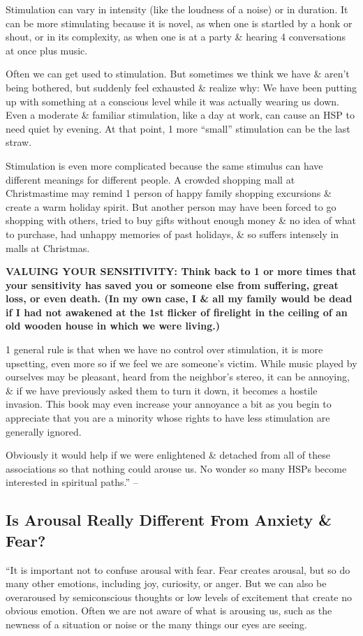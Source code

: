 \documentclass{article}
\numberwithin{equation}{section}
\begin{document}
Stimulation can vary in intensity (like the loudness of a noise) or in duration. It can be more stimulating because it is novel, as when one is startled by a honk or shout, or in its complexity, as when one is at a party \& hearing 4 conversations at once plus music.

Often we can get used to stimulation. But sometimes we think we have \& aren't being bothered, but suddenly feel exhausted \& realize why: We have been putting up with something at a conscious level while it was actually wearing us down. Even a moderate \& familiar stimulation, like a day at work, can cause an HSP to need quiet by evening. At that point, 1 more ``small'' stimulation can be the last straw.

Stimulation is even more complicated because the same stimulus can have different meanings for different people. A crowded shopping mall at Christmastime may remind 1 person of happy family shopping excursions \& create a warm holiday spirit. But another person may have been forced to go shopping with others, tried to buy gifts without enough money \& no idea of what to purchase, had unhappy memories of past holidays, \& so suffers intensely in malls at Christmas.

\textbf{VALUING YOUR SENSITIVITY: Think back to 1 or more times that your sensitivity has saved you or someone else from suffering, great loss, or even death. (In my own case, I \& all my family would be dead if I had not awakened at the 1st flicker of firelight in the ceiling of an old wooden house in which we were living.)}

1 general rule is that when we have no control over stimulation, it is more upsetting, even more so if we feel we are someone's victim. While music played by ourselves may be pleasant, heard from the neighbor's stereo, it can be annoying, \& if we have previously asked them to turn it down, it becomes a hostile invasion. This book may even increase your annoyance a bit as you begin to appreciate that you are a minority whose rights to have less stimulation are generally ignored.

Obviously it would help if we were enlightened \& detached from all of these associations so that nothing could arouse us. No wonder so many HSPs become interested in spiritual paths.'' -- \cite[pp. 42--43]{Aron2013}

\subsection{Is Arousal Really Different From Anxiety \& Fear?}
``It is important not to confuse arousal with fear. Fear creates arousal, but so do many other emotions, including joy, curiosity, or anger. But we can also be overaroused by semiconscious thoughts or low levels of excitement that create no obvious emotion. Often we are not aware of what is arousing us, such as the newness of a situation or noise or the many things our eyes are seeing.
\end{document}
